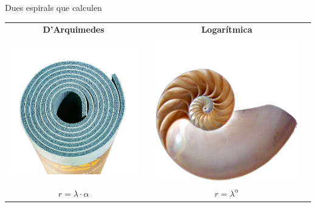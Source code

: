 \documentclass[14pt]{beamer}
\begin{document}
    \begin{frame}{Dues espirals que calculen}
        \begin{center}
            \begin{tabular}{cccc}
                \textbf{D'Arquimedes} & \qquad & \textbf{Logarítmica} & \quad \\[1ex]
                \includegraphics[width=20ex]{pictures/Yoga.jpg} & &
                \includegraphics[width=20ex]{pictures/Nautilus.jpg} & \\[1ex]
                {\Large $r = \lambda\cdot\alpha$ } & & {\Large $r = \lambda^\alpha$ } & \\
            \end{tabular}
        \end{center}
    \end{frame}

\end{document}

